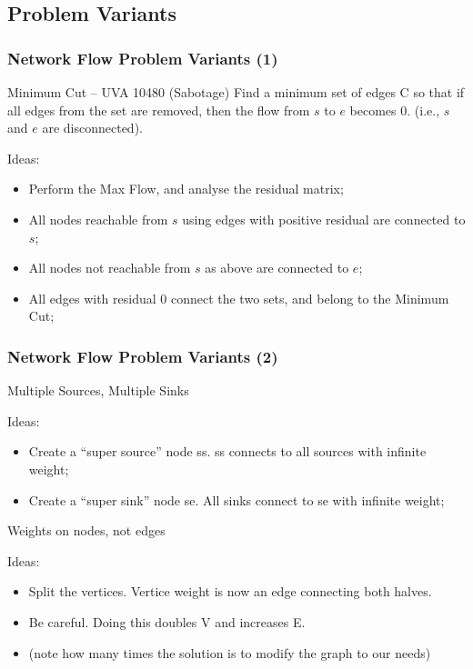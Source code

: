 \subsection{Problem Variants}
\begin{frame}
  \frametitle{Network Flow Problem Variants (1)}
  {\smaller
  \begin{block}{Minimum Cut -- UVA 10480 (Sabotage)}
    Find a minimum set of edges C so that if all edges from the set
    are removed, then the flow from $s$ to $e$ becomes 0. (i.e., $s$
    and $e$ are disconnected).
  \end{block}

  Ideas:
  \begin{itemize}
  \item Perform the Max Flow, and analyse the residual matrix;
  \item All nodes reachable from $s$ using edges with positive
    residual are connected to $s$;
  \item All nodes not reachable from $s$ as above are connected to $e$;
  \item All edges with residual $0$ connect the two sets, and belong
    to the Minimum Cut;
  \end{itemize}
  }
\end{frame}

\begin{frame}
  \frametitle{Network Flow Problem Variants (2)}
  {\smaller
    \begin{block}{Multiple Sources, Multiple Sinks}
    \end{block}

    Ideas:
    \begin{itemize}
    \item Create a ``super source'' node ss. ss connects to all sources with infinite weight;
    \item Create a ``super sink'' node se. All sinks connect to se with infinite weight;
    \end{itemize}

    \begin{block}{Weights on nodes, not edges}
    \end{block}
    Ideas:
    \begin{itemize}
    \item Split the vertices. Vertice weight is now an edge connecting both halves.
    \item Be careful. Doing this doubles V and increases E.
    \item (note how many times the solution is to modify the graph to our needs)
    \end{itemize}

  }
\end{frame}

